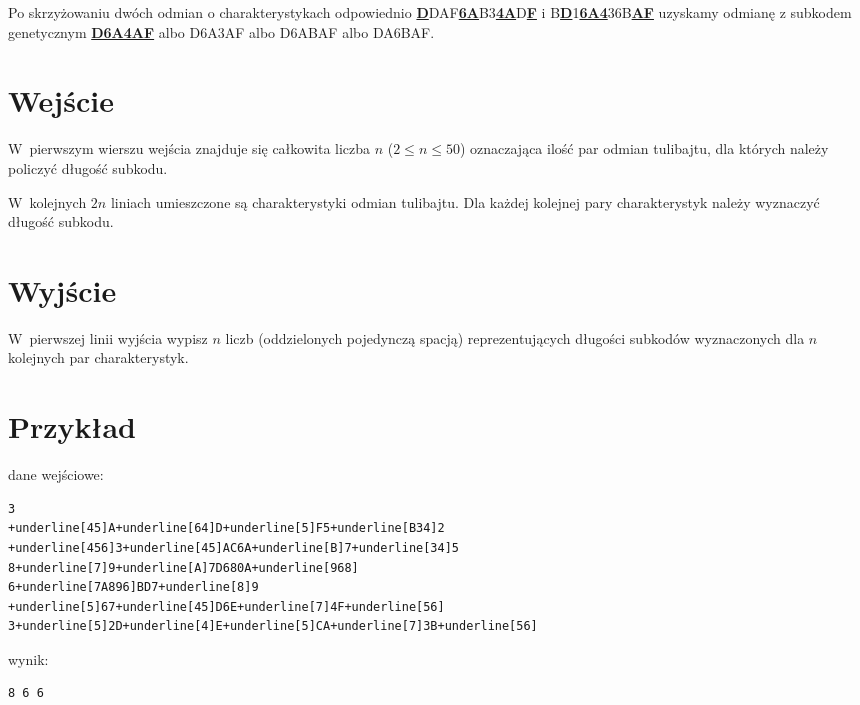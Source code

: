 \documentclass{article}
\begin{document}
Po skrzyżowaniu dwóch odmian o charakterystykach odpowiednio
\underline{\textbf{D}}DAF\underline{\textbf{6A}}B3\underline{\textbf{4A}}D\underline{\textbf{F}} i B\underline{\textbf{D}}1\underline{\textbf{6A4}}36B\underline{\textbf{AF}}
uzyskamy odmianę z subkodem genetycznym
\underline{\textbf{D6A4AF}} albo D6A3AF albo D6ABAF albo DA6BAF.

\section*{Wejście}

W~pierwszym wierszu wejścia znajduje się całkowita liczba $n$ ($2 \leqslant n \leqslant 50$) oznaczająca ilość par odmian tulibajtu, dla których należy
policzyć długość subkodu.

W~kolejnych $2n$ liniach umieszczone są charakterystyki odmian tulibajtu. Dla każdej kolejnej pary charakterystyk należy
wyznaczyć długość subkodu.

\section*{Wyjście}

W~pierwszej linii wyjścia wypisz $n$ liczb (oddzielonych pojedynczą spacją) reprezentujących długości subkodów
wyznaczonych dla $n$ kolejnych par charakterystyk.

\section*{Przykład}
\begin{multicols*}{2}
dane wejściowe:
\begin{Verbatim}[commandchars=+\[\]]
3
+underline[45]A+underline[64]D+underline[5]F5+underline[B34]2
+underline[456]3+underline[45]AC6A+underline[B]7+underline[34]5
8+underline[7]9+underline[A]7D680A+underline[968]
6+underline[7A896]BD7+underline[8]9
+underline[5]67+underline[45]D6E+underline[7]4F+underline[56]
3+underline[5]2D+underline[4]E+underline[5]CA+underline[7]3B+underline[56]
\end{Verbatim}
wynik:
\begin{Verbatim}[commandchars=+\[\]]
8 6 6
\end{Verbatim}
\end{multicols*}
\end{document}
